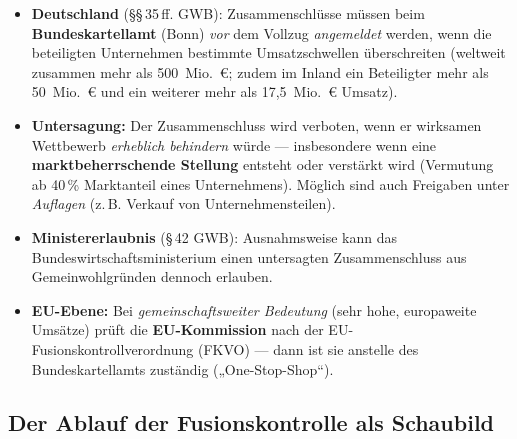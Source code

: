 \documentclass[11pt, a4paper]{article}
\begin{document}
\begin{itemize}
  \item \textbf{Deutschland} (\S\S\,35\,ff. GWB): Zusammenschlüsse müssen beim
    \textbf{Bundeskartellamt} (Bonn) \emph{vor} dem Vollzug \emph{angemeldet} werden,
    wenn die beteiligten Unternehmen bestimmte Umsatzschwellen überschreiten (weltweit
    zusammen mehr als 500~Mio.~€; zudem im Inland ein Beteiligter mehr als 50~Mio.~€
    und ein weiterer mehr als 17,5~Mio.~€ Umsatz).
  \item \textbf{Untersagung:} Der Zusammenschluss wird verboten, wenn er wirksamen
    Wettbewerb \emph{erheblich behindern} würde --- insbesondere wenn eine
    \textbf{marktbeherrschende Stellung} entsteht oder verstärkt wird (Vermutung ab
    40\,\% Marktanteil eines Unternehmens). Möglich sind auch Freigaben unter
    \emph{Auflagen} (z.\,B. Verkauf von Unternehmensteilen).
  \item \textbf{Ministererlaubnis} (\S\,42 GWB): Ausnahmsweise kann das
    Bundeswirtschaftsministerium einen untersagten Zusammenschluss aus
    Gemeinwohlgründen dennoch erlauben.
  \item \textbf{EU-Ebene:} Bei \emph{gemeinschaftsweiter Bedeutung} (sehr hohe,
    europaweite Umsätze) prüft die \textbf{EU-Kommission} nach der
    EU-Fusionskontrollverordnung (FKVO) --- dann ist sie anstelle des Bundeskartellamts
    zuständig („One-Stop-Shop``).
\end{itemize}

\subsection{Der Ablauf der Fusionskontrolle als Schaubild}
\end{document}
